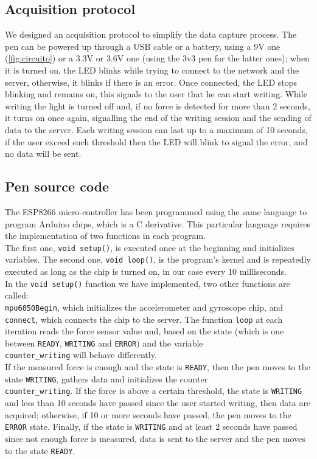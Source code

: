 \documentclass[8pt,notitlepage]{report}
\begin{document}
		\subsection{Acquisition protocol}
			We designed an acquisition protocol to simplify the data capture process. The pen can be powered up through a USB cable or a battery, using a 9V one (\cref{fig:circuito}) or a 3.3V or 3.6V one (using the 3v3 pen for the latter ones); when it is turned on, the LED blinks while trying to connect to the network and the server, otherwise, it blinks if there is an error. Once connected, the LED stops blinking and remains on, this signals to the user that he can start writing. While writing the light is turned off and, if no force is detected for more than 2 seconds, it turns on once again, signalling the end of the writing session and the sending of data to the server. Each writing session can last up to a maximum of 10 seconds, if the user exceed such threshold then the LED will blink to signal the error, and no data will be sent.
		
		\subsection{Pen source code}
			The ESP8266 micro-controller has been programmed using the same language to program Arduino chips, which is a C derivative. This particular language requires the implementation of two functions in each program. \\
			The first one, \verb|void setup()|, is executed once at the beginning and initializes variables. The second one, \verb|void loop()|, is the program's kernel and is repeatedly executed as long as the chip is turned on, in our case every 10 milliseconds. \\
			In the \verb|void setup()| function we have implemented, two other functions are called: \\ \verb|mpu6050Begin|, which initializes the accelerometer and gyroscope chip, and \verb|connect|, which connects the chip to the server. The function \verb|loop| at each iteration reads the force sensor value and, based on the state (which is one between \verb|READY|, \verb|WRITING| and \verb|ERROR|) and the variable \\ \verb|counter_writing| will behave differently. \\ If the measured force is enough and the state is \verb|READY|, then the pen moves to the state \verb|WRITING|, gathers data and initializes the counter \\ \verb|counter_writing|. If the force is above a certain threshold, the state is \verb|WRITING| and less than 10 seconds have passed since the user started writing, then data are acquired; otherwise, if 10 or more seconds have passed, the pen moves to the \verb|ERROR| state. Finally, if the state is \verb|WRITING| and at least 2 seconds have passed since not enough force is measured, data is sent to the server and the pen moves to the state \verb|READY|.
			
\end{document}
